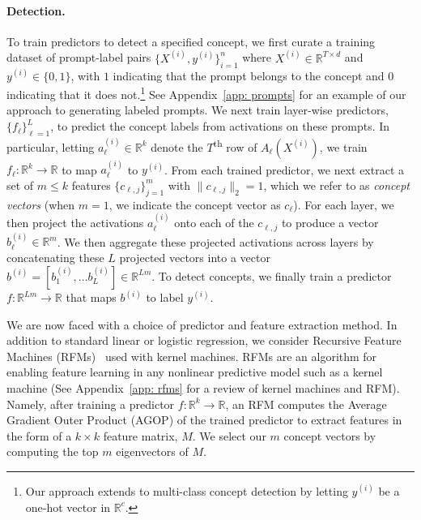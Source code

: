\paragraph{Detection.}  To train predictors to detect a specified concept, we first curate a training dataset of prompt-label pairs $\{X^{(i)}, y^{(i)}\}_{i=1}^{n}$ where $X^{(i)} \in \mathbb{R}^{T \times d}$ and $y^{(i)} \in \{0, 1\}$, with $1$ indicating that the prompt belongs to the concept and $0$ indicating that it does not.\footnote{Our approach extends to multi-class concept detection by letting $y^{(i)}$ be a one-hot vector in $\mathbb{R}^{c}$.} See Appendix~\ref{app: prompts} for an example of our approach to generating labeled prompts. We next train layer-wise predictors, $\{f_{\ell}\}_{\ell = 1}^{L}$, to predict the concept labels from activations on these prompts.  In particular, letting $a_{\ell}^{(i)} \in \mathbb{R}^{k}$ denote the $T$\textsuperscript{th} row of $A_{\ell}(X^{(i)})$, we train $f_{\ell}: \mathbb{R}^{k} \to \mathbb{R}$ to map $a_{\ell}^{(i)}$ to $y^{(i)}$.  From each trained predictor, we next extract a set of $m \leq k$ features $\{c_{\ell, j}\}_{j=1}^{m}$ with $\|c_{\ell, j}\|_2 = 1$, which we refer to as \textit{concept vectors} (when $m = 1$, we indicate the concept vector as $c_{\ell}$).  For each layer, we then project the activations $a_{\ell}^{(i)}$ onto each of the $c_{\ell, j}$ to produce a vector $b_{\ell}^{(i)} \in \mathbb{R}^{m}$.  We then aggregate these projected activations across layers by concatenating these $L$ projected vectors into a vector $b^{(i)} = \left[ b_{1}^{(i)}, \ldots b_{L}^{(i)}\right] \in \mathbb{R}^{Lm}$.  To detect concepts, we finally train a predictor $f: \mathbb{R}^{Lm} \to \mathbb{R}$ that maps $b^{(i)}$ to label $y^{(i)}$.      

We are now faced with a choice of predictor and feature extraction method. In addition to standard linear or logistic regression, we consider Recursive Feature Machines (RFMs)~\cite{rfm_science} used with kernel machines. RFMs are an algorithm for enabling feature learning in any nonlinear predictive model such as a kernel machine (See Appendix~\ref{app: rfms} for a review of kernel machines and RFM).  Namely, after training a predictor $f: \mathbb{R}^{k} \to \mathbb{R}$, an RFM computes the Average Gradient Outer Product (AGOP) of the trained predictor to extract features in the form of a $k \times k$ feature matrix, $M$.  We select our $m$ concept vectors by computing the top $m$ eigenvectors of $M$.  


